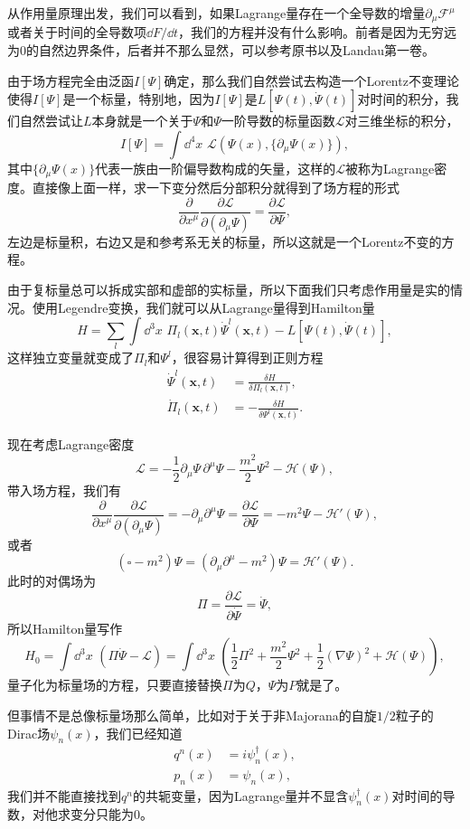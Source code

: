 \documentclass[10pt]{extbook}
\theoremstyle{plain}%
\begin{document}
从作用量原理出发，我们可以看到，如果Lagrange量存在一个全导数的增量$\partial_\mu \mathscr{F}^\mu$或者关于时间的全导数项$\dd F/\dd t$，我们的方程并没有什么影响。前者是因为无穷远为0的自然边界条件，后者并不那么显然，可以参考原书以及Landau第一卷。

由于场方程完全由泛函$I[\Psi]$确定，那么我们自然尝试去构造一个Lorentz不变理论使得$I[\Psi]$是一个标量，特别地，因为$I[\Psi]$是$L[\Psi(t),\dot{\Psi}(t)]$对时间的积分，我们自然尝试让$L$本身就是一个关于$\Psi$和$\Psi$一阶导数的标量函数$\mathscr{L}$对三维坐标的积分，
\[
	I[\Psi]=\int \dd^4x\,\, \mathscr{L}\left(\Psi(x),\{\partial_\mu \Psi(x)\}\right),
\]
其中$\{\partial_\mu \Psi(x)\}$代表一族由一阶偏导数构成的矢量，这样的$\mathscr{L}$被称为Lagrange密度。直接像上面一样，求一下变分然后分部积分就得到了场方程的形式
\[
	\frac{\partial}{\partial x^\mu}\frac{\partial \mathscr{L}}{\partial \left(\partial_\mu \Psi\right)}=\frac{\partial \mathscr{L}}{\partial \Psi},
\]
左边是标量积，右边又是和参考系无关的标量，所以这就是一个Lorentz不变的方程。

由于复标量总可以拆成实部和虚部的实标量，所以下面我们只考虑作用量是实的情况。使用Legendre变换，我们就可以从Lagrange量得到Hamilton量
\[
	H=\sum_l \int \dd^3 x \,\, \Pi_l(\mathbf{x},t)\dot{\Psi}^l(\mathbf{x},t)-L[\Psi(t),\dot{\Psi}(t)],
\]
这样独立变量就变成了$\Pi_l$和$\Psi^l$，很容易计算得到正则方程
\[
\begin{split}
	\dot{\Psi}^l(\mathbf{x},t)&=\frac{\delta H}{\delta \Pi_l(\mathbf{x},t)},\\
	\dot{\Pi}_l(\mathbf{x},t)&=-\frac{\delta H}{\delta \Psi^l(\mathbf{x},t)}.
\end{split}
\]

现在考虑Lagrange密度
\[
	\mathscr{L}=-\frac{1}{2}\partial_\mu\Psi\,\partial^\mu\Psi-\frac{m^2}{2}\Psi^2-\mathscr{H}(\Psi),
\]
带入场方程，我们有
\[
	\frac{\partial}{\partial x^\mu}\frac{\partial \mathscr{L}}{\partial \left(\partial_\mu \Psi\right)}=-\partial_\mu\partial^\mu\Psi=\frac{\partial \mathscr{L}}{\partial \Psi}=-m^2\Psi-\mathscr{H}'(\Psi),
\]
或者
\[
	(\square-m^2)\Psi=(\partial_\mu\partial^\mu-m^2)\Psi=\mathscr{H}'(\Psi).
\]
此时的对偶场为
\[
	\Pi=\frac{\partial \mathscr{L}}{\partial \dot{\Psi}}=\dot{\Psi},
\]
所以Hamilton量写作
\[
	H_0=\int \dd^3 x\,\,(\Pi\dot{\Psi}-\mathscr{L})=\int \dd^3 x\,\,\left(\frac{1}{2}\Pi^2+\frac{m^2}{2}\Psi^2+\frac{1}{2}(\nabla \Psi)^2+\mathscr{H}(\Psi)\right),
\]
量子化为标量场的方程，只要直接替换$\Pi$为$Q$，$\Psi$为$P$就是了。

但事情不是总像标量场那么简单，比如对于关于非Majorana的自旋$1/2$粒子的Dirac场$\psi_n(x)$，我们已经知道
\[
	\begin{split}
	q^n(x)&=i\psi^\dag_n(x),\\
	p_n(x)&=\psi_n(x),
	\end{split}
\]
我们并不能直接找到$q^n$的共轭变量，因为Lagrange量并不显含$\psi^\dag_n(x)$对时间的导数，对他求变分只能为0。
\end{document}
